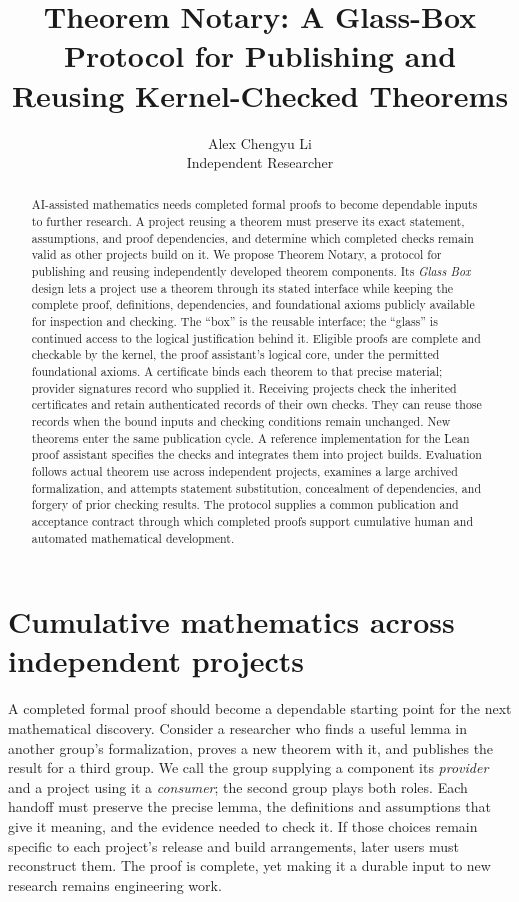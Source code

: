 \documentclass[11pt]{article}
\title{Theorem Notary: A Glass-Box Protocol for Publishing and Reusing Kernel-Checked Theorems}
\author{Alex Chengyu Li\\\small Independent Researcher}
\date{}
\begin{document}
\maketitle
\begin{abstract}
AI-assisted mathematics needs completed formal proofs to become dependable
inputs to further research. A project reusing a theorem must preserve its exact
statement, assumptions, and proof dependencies, and determine which completed
checks remain valid as other projects build on it. We propose Theorem Notary,
a protocol for publishing and reusing independently developed theorem
components. Its \emph{Glass Box} design lets a project use a theorem through its
stated interface while keeping the complete proof, definitions, dependencies,
and foundational axioms publicly available for inspection and checking. The
``box'' is the reusable interface; the ``glass'' is continued access to the
logical justification behind it. Eligible proofs are complete and checkable
by the kernel, the proof assistant's logical core, under the permitted
foundational axioms. A certificate binds each theorem to that precise material;
provider signatures record who supplied it. Receiving projects check the
inherited certificates and retain authenticated records of their own checks.
They can reuse those records when the bound inputs and checking conditions
remain unchanged. New theorems enter the same publication cycle. A reference
implementation for the Lean proof assistant specifies the checks and integrates
them into project builds. Evaluation follows actual theorem use across
independent projects, examines a large archived formalization, and attempts
statement substitution, concealment of dependencies, and forgery of prior
checking results. The protocol supplies a common publication and acceptance
contract through which completed proofs support cumulative human and automated
mathematical development.
\end{abstract}

\section{Cumulative mathematics across independent projects}

A completed formal proof should become a dependable starting point for the
next mathematical discovery. Consider a researcher who finds a useful lemma
in another group's formalization, proves a new theorem with it, and publishes
the result for a third group. We call the group supplying a component its
\emph{provider} and a project using it a \emph{consumer}; the second group plays
both roles. Each handoff must preserve the precise lemma,
the definitions and assumptions that give it meaning, and the evidence needed
to check it. If those choices remain specific to each project's release and
build arrangements, later users must reconstruct them. The proof is complete,
yet making it a durable input to new research remains engineering work.
\end{document}
